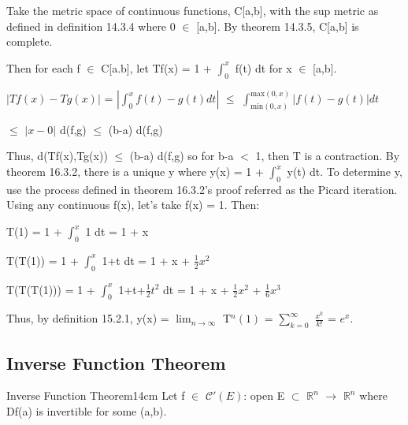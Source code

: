     \begin{tbox}
        Take the metric space of continuous functions, C[a,b],
        with the sup metric as defined in {\color{blue} definition 14.3.4}
        where 0 $\in$ [a,b].
        By {\color{red} theorem 14.3.5}, C[a,b] is complete.
        
        Then for each f $\in$ C[a.b], let Tf(x) = 1 + $\int_0^x$ f(t) dt
        for x $\in$ [a,b].
        
        \hspace{0.5cm}
        $|Tf(x) - Tg(x)|$
        = $|\int_0^x f(t)-g(t) dt|$
        $\leq$ $\int_{\text{min}(0,x)}^{\text{max}(0,x)} | f(t)-g(t) | dt$

        \hspace{3.55cm}
        $\leq$ $|x-0|$ d(f,g)
        $\leq$ (b-a) d(f,g)

        Thus, d(Tf(x),Tg(x)) $\leq$ (b-a) d(f,g) so for b-a $<$ 1, then T
        is a contraction.
        By {\color{red} theorem 16.3.2},
        there is a unique y where y(x) = 1 + $\int_0^x$ y(t) dt.
        To determine y, use the process defined in {\color{red} theorem 16.3.2}'s
        proof referred as the Picard iteration. Using any continuous f(x),
        let's take f(x) = 1. Then:

        \hspace{0.5cm}
        T(1)
        = 1 + $\int_0^x$ 1 dt
        = 1 + x

        \hspace{0.5cm}
        T(T(1))
        = 1 + $\int_0^x$ 1+t dt
        = 1 + x + $\frac{1}{2}x^2$

        \hspace{0.5cm}
        T(T(T(1)))
        = 1 + $\int_0^x$ 1+t+$\frac{1}{2}t^2$ dt
        = 1 + x + $\frac{1}{2}x^2$ + $\frac{1}{6}x^3$

        Thus, by {\color{blue} definition 15.2.1}, y(x)
        = $\lim_{n \rightarrow \infty}$ T$^n(1)$
        = $\sum_{k=0}^{\infty}$ $\frac{x^k}{k!}$ = $e^x$.
    \end{tbox}

    \newpage





\subsection{ Inverse Function Theorem }

    \begin{wtheorem}{Inverse Function Theorem}{14cm}
        Let f $\in$ $\mathscr{C}'(E)$: open E $\subset$ $\mathbb{R}^n$
        $\rightarrow$ $\mathbb{R}^n$ where Df(a) is invertible
        for some (a,b).
    \end{wtheorem}

